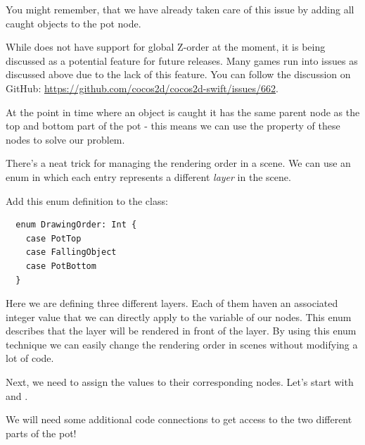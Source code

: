 You might remember, that we have already taken care of this issue by adding all
caught objects to the pot node. 

\begin{details} 
While \cocos{} does not have support for global Z-order at the moment, it is
being discussed as a potential feature for future releases. Many games run into
issues as discussed above due to the lack of this feature. You can follow the
discussion on GitHub: \url{https://github.com/cocos2d/cocos2d-swift/issues/662}.
\end{details}

At the point in time where an object is caught it has the same parent node as
the top and bottom part of the pot - this means we can use the
 property of these nodes to solve our problem.

There's a neat trick for managing the rendering order in a scene. We can use an
enum in which each entry represents a different \textit{layer} in the scene.

\begin{leftbar}
Add this enum definition to the  class:
\begin{lstlisting}
  enum DrawingOrder: Int {
    case PotTop
    case FallingObject
    case PotBottom
  }
\end{lstlisting}
\end{leftbar}
Here we are defining three different layers. Each of them haven an associated
integer value that we can directly apply to the 
variable of our nodes. This enum describes that the 
layer will be rendered in front of the  layer.
By using this enum technique we can easily change the rendering order in scenes
without modifying a lot of code.

Next, we need to assign the  values to their corresponding
nodes. Let's start with  and .

We will need some additional code connections to get access to the two different
parts of the pot!

